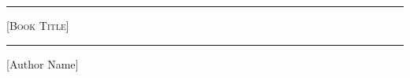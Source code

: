 \thispagestyle{empty}
\begin{center}
  \newlength{\parSepLength}
  \setlength{\parSepLength}{10ex}
  \Large
  \centering
  \hrule\par
  \par\vspace{0.15\parSepLength}
  \begin{minipage}{\textwidth}
    \centering
    \fontsize{40pt}{36pt}\selectfont\scshape
    [Book Title]
  \end{minipage}
  \par\vspace{0.25\parSepLength}
  \par\hrule
  \vspace{0.125\parSepLength}
  \vfill
  \begin{minipage}{\textwidth}
    \centering
    \Large
   [Author Name]
  \end{minipage}
  \vfill
\end{center}
\pagebreak
